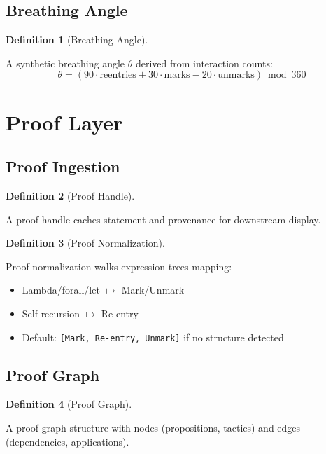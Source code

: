 \documentclass{amsart}
\theoremstyle{definition}
\newtheorem{definition}{Definition}[section]
\theoremstyle{remark}
\begin{document}
\subsection{Breathing Angle}
\label{sec:breathing-angle}

\begin{definition}[Breathing Angle]
\label{def:breathing-angle}

A synthetic breathing angle $\theta$ derived from interaction counts:
\[
\theta = (90 \cdot \text{reentries} + 30 \cdot \text{marks} - 20 \cdot \text{unmarks}) \bmod 360
\]
\end{definition}

\section{Proof Layer}

\subsection{Proof Ingestion}
\label{sec:proof-ingestion}

\begin{definition}[Proof Handle]
\label{def:proof-handle}
\uses{}

A proof handle caches statement and provenance for downstream display.
\end{definition}

\begin{definition}[Proof Normalization]
\label{def:proof-normalize}

Proof normalization walks expression trees mapping:
\begin{itemize}
\item Lambda/forall/let $\mapsto$ Mark/Unmark
\item Self-recursion $\mapsto$ Re-entry
\item Default: \texttt{[Mark, Re-entry, Unmark]} if no structure detected
\end{itemize}
\end{definition}

\subsection{Proof Graph}
\label{sec:proof-graph}

\begin{definition}[Proof Graph]
\label{def:proof-graph}

A proof graph structure with nodes (propositions, tactics) and edges (dependencies, applications).
\end{definition}
\end{document}
